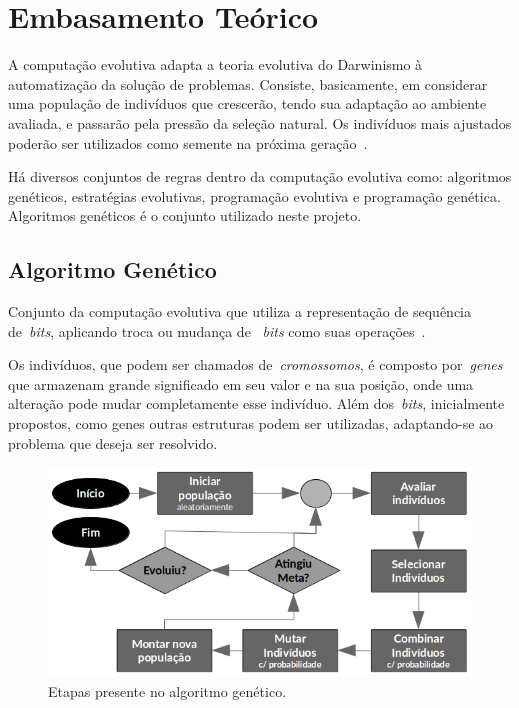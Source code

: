 \section{Embasamento Teórico}
    \label{sec:emb_teo}
A computação evolutiva adapta a teoria evolutiva do Darwinismo à automatização da solução de problemas. Consiste, basicamente, em considerar uma população de indivíduos que crescerão, tendo sua adaptação ao ambiente avaliada, e passarão pela pressão da seleção natural. Os indivíduos mais ajustados poderão ser utilizados como semente na próxima geração~\cite{EIBEN20021}.

Há diversos conjuntos de regras dentro da computação evolutiva como: algoritmos genéticos, estratégias evolutivas, programação evolutiva e programação genética. Algoritmos genéticos é o conjunto utilizado neste projeto.

\subsection{Algoritmo Genético}
    \label{subsec:emb_teo_alg_gntc}
Conjunto da computação evolutiva que utiliza a representação de sequência de~\emph{bits}, aplicando troca ou mudança de ~\emph{bits} como suas operações~\cite{EIBEN20021}.

Os indivíduos, que podem ser chamados de~\emph{cromossomos}, é composto por~\emph{genes} que armazenam grande significado em seu valor e na sua posição, onde uma alteração pode mudar completamente esse indivíduo. Além dos~\emph{bits}, inicialmente propostos, como genes outras estruturas podem ser utilizadas, adaptando-se ao problema que deseja ser resolvido.

\begin{figure}[!ht]
    \centering
    \includegraphics[width=\linewidth]{Imagens/Genetic_algorithm_steps.png}
    \caption{Etapas presente no algoritmo genético.}
    \label{fig:emb_alg_gntc_etapas}
\end{figure}

